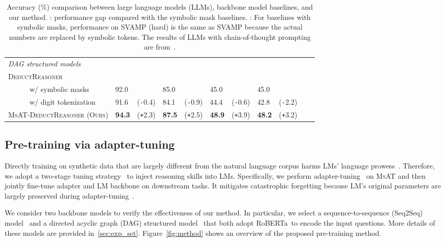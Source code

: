 \documentclass[11pt]{article}
\newcommand{\ba}{}
\newcommand\tf[1]{\textbf{#1}}
\begin{document}
\begin{table*}[t]
{\begin{tabular}{lllllllllll}
  \midrule
    \multicolumn{5}{l}{\it{DAG structured models}}\\

    \textsc{DeductReasoner}~\cite{jie2022deductreason}& & & & \\
      
    ~~~~~~w/ symbolic masks
    & 92.0 & & 85.0 & & 45.0 & & 45.0 \\

    ~~~~~~w/ digit tokenization
    & 91.6 & (\texttt{-}0.4) & 84.1 & (\texttt{-}0.9) & 44.4 & (\texttt{-}0.6) & 42.8 & (\texttt{-}2.2)\\

    \textsc{MsAT-DeductReasoner (Ours)}
    & \tf{94.3} & (\texttt{+}2.3) & \tf{87.5} & (\texttt{+}2.5) & \tf{48.9} & (\texttt{+}3.9) & \tf{48.2} & (\texttt{+}3.2)\\
    \bottomrule
\end{tabular}}
\caption{
        \label{tab:main_results}
        Accuracy (\%) comparison between large language models (LLMs), backbone model baselines, and our method. 
: performance gap compared with the symbolic mask baselines.
: For baselines with symbolic masks, performance on SVAMP (hard) is the same as SVAMP because the actual numbers are replaced by symbolic tokens.
The results of LLMs with chain-of-thought prompting are from~\citet{wei2022cot}.
    }
\end{table*}


    \subsection{Pre-training via adapter-tuning}

      Directly training on synthetic data that are largely different from the natural language corpus
        harms LMs' language prowess~\cite{geva2020genbert}.
Therefore, we adopt a two-stage tuning strategy~\cite{wang2022diffaug} to inject reasoning skills into LMs.
Specifically, we perform adapter-tuning~\cite{houlsby2019adapter} on \textsc{MsAT} and then jointly fine-tune adapter and LM backbone on downstream tasks.
It mitigates catastrophic forgetting because LM's original parameters are largely preserved during adapter-tuning~\cite{houlsby2019adapter}.


      We consider two backbone models to verify the effectiveness of our method.
In particular, we select a sequence-to-sequence (Seq2Seq) model~\cite{lan2021mwptoolkit} and a directed acyclic graph (DAG) structured model~\cite{jie2022deductreason} that both adopt RoBERTa\ba \ to encode the input questions.
More details of these models are provided in~\cref{sec:exp_set}.
Figure~\ref{fig:method} shows an overview of the proposed pre-training method.
\end{document}
